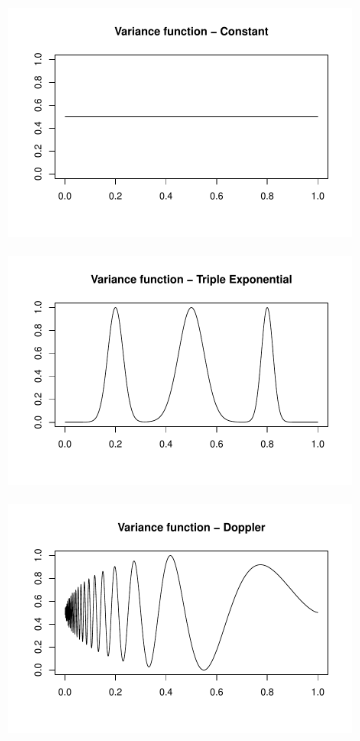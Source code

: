 \documentclass[12pt]{article}
\begin{document}
\begin{figure}
\centering
    \begin{subfigure}[b]{0.48\textwidth}
        \centering
        \includegraphics[width=\textwidth]{gaus_var_cons.pdf}
        \caption{}
        \label{fig:gaus_var_cons}
    \end{subfigure}
		\hfill
    \begin{subfigure}[b]{0.48\textwidth}
        \centering
        \includegraphics[width=\textwidth]{gaus_var_texp.pdf}
        \caption{}
        \label{fig:gaus_var_texp}
    \end{subfigure}
		\hfill
    \begin{subfigure}[b]{0.48\textwidth}
        \centering
        \includegraphics[width=\textwidth]{gaus_var_dop.pdf}

\end{subfigure}
\end{figure}
\end{document}
